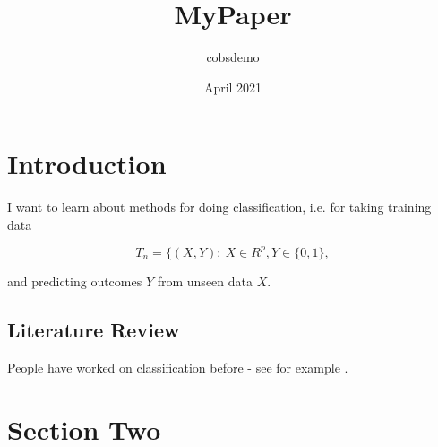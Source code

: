 \documentclass{article}
\title{MyPaper}
\author{cobsdemo }
\date{April 2021}
\begin{document}
\maketitle

\section{Introduction}
I want to learn about methods for doing classification, i.e. for taking training data 

\[ T_n = \{ (X,Y): \ X \in R^p, Y \in \{0,1\}, \]

and predicting outcomes $Y$ from unseen data $X$.

\subsection{Literature Review} 
People have worked on classification before - see for example \cite{cannings_random-projection_2017}.

\section{Section Two}



\end{document}
